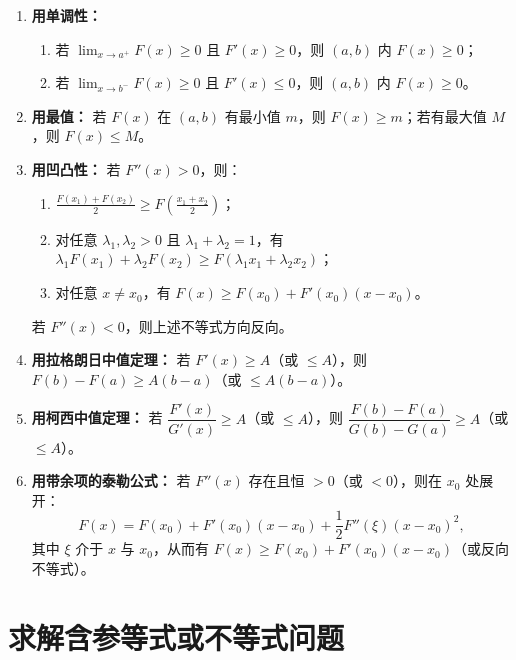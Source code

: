 \begin{enumerate}
    \item \textbf{用单调性：}
          \begin{enumerate}
              \item 若 $\displaystyle\lim_{x\to a^+}F(x)\ge0$ 且 $F'(x)\ge0$，则 $(a,b)$ 内 $F(x)\ge0$；
              \item 若 $\displaystyle\lim_{x\to b^-}F(x)\ge0$ 且 $F'(x)\le0$，则 $(a,b)$ 内 $F(x)\ge0$。
          \end{enumerate}

    \item \textbf{用最值：}
          若 $F(x)$ 在 $(a,b)$ 有最小值 $m$，则 $F(x)\ge m$；若有最大值 $M$，则 $F(x)\le M$。

    \item \textbf{用凹凸性：}
          若 $F''(x)>0$，则：
          \begin{enumerate}
              \item $\displaystyle \frac{F(x_1)+F(x_2)}{2}\ge F\!\left(\frac{x_1+x_2}{2}\right)$；
              \item 对任意 $\lambda_1,\lambda_2>0$ 且 $\lambda_1+\lambda_2=1$，有
                    $\lambda_1F(x_1)+\lambda_2F(x_2)\ge F(\lambda_1x_1+\lambda_2x_2)$；
              \item 对任意 $x\ne x_0$，有 $F(x)\ge F(x_0)+F'(x_0)(x-x_0)$。
          \end{enumerate}
          若 $F''(x)<0$，则上述不等式方向反向。

    \item \textbf{用拉格朗日中值定理：}
          若 $F'(x)\ge A$（或 $\le A$），则
          $F(b)-F(a)\ge A(b-a)$（或 $\le A(b-a)$）。

    \item \textbf{用柯西中值定理：}
          若 $\dfrac{F'(x)}{G'(x)}\ge A$（或 $\le A$），则
          $\dfrac{F(b)-F(a)}{G(b)-G(a)}\ge A$（或 $\le A$）。

    \item \textbf{用带余项的泰勒公式：}
          若 $F''(x)$ 存在且恒 $>0$（或 $<0$），则在 $x_0$ 处展开：
          \[
              F(x)=F(x_0)+F'(x_0)(x-x_0)+\frac{1}{2}F''(\xi)(x-x_0)^2,
          \]
          其中 $\xi$ 介于 $x$ 与 $x_0$，从而有
          $F(x)\ge F(x_0)+F'(x_0)(x-x_0)$（或反向不等式）。
\end{enumerate}

\section{求解含参等式或不等式问题}

